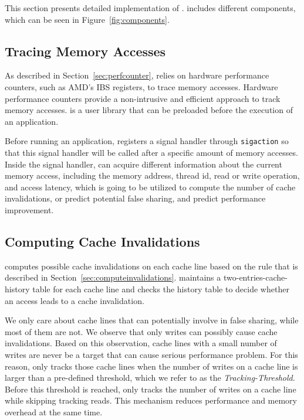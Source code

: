 \label{sec:implement}
This section presents detailed implementation of \Cheetah{}. \Cheetah{} includes different components, which can be seen in Figure~\ref{fig:components}. 


\subsection{Tracing Memory Accesses}


As described in Section~\ref{sec:perfcounter}, \Cheetah{} relies on hardware performance counters, such as AMD's IBS registers, to trace memory accesses. Hardware performance counters provide a non-intrusive and efficient approach to track memory accesses. \Cheetah{} is a user library that can be preloaded before the execution of an application. 

Before running an application, \Cheetah{}  registers a signal handler through \texttt{sigaction} so that this signal handler will be called after a specific amount of memory accesses. Inside the signal handler, \Cheetah{} can acquire different information about the current memory access, including the memory address, thread id, read or write operation, and access latency, which is going to be utilized to compute the number of cache invalidations, or predict potential false sharing, and predict performance improvement. 


\subsection{Computing Cache Invalidations}
\label{sec:compute}
% 
\Cheetah{} computes possible cache invalidations on each cache line based on the rule that is described in Section~\ref{sec:computeinvalidations}. \Cheetah{} maintains a two-entries-cache-history table for each cache line and checks the history table to decide whether an access leads to a cache invalidation. 

We only care about cache lines that can potentially involve in false sharing, while most of them are not. We observe that only writes can possibly cause cache invalidations. Based on this observation, cache lines with a small number of writes are never be a target that can cause serious performance problem. For this reason, \Cheetah{} only tracks those cache lines when the number of writes on a cache line is larger than a pre-defined threshold, which we refer to as the {\it Tracking-Threshold}. Before this threshold is reached, \Cheetah{} only tracks the number of writes on a cache line while skipping tracking reads. This mechanism reduces performance and memory overhead at the same time.

